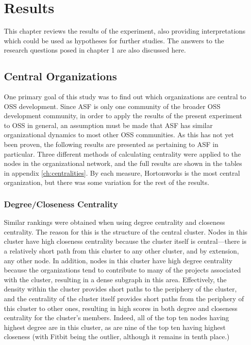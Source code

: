 \chapter{Results}
This chapter reviews the results of the experiment, also providing interpretations which could be used as hypotheses for further studies. The answers to the research questions posed in chapter 1 are also discussed here.

 

\section{Central Organizations}
One primary goal of this study was to find out which organizations are central to OSS development. Since ASF is only one community of the broader OSS development community, in order to apply the results of the present experiment to OSS in general, an assumption must be made that ASF has similar organizational dynamics to most other OSS communities. As this has not yet been proven, the following results are presented as pertaining to ASF in particular. Three different methods of calculating centrality were applied to the nodes in the organizational network, and the full results are shown in the tables in appendix \ref{ch:centralities}. By each measure, Hortonworks is the most central organization, but there was some variation for the rest of the results.

 
\subsection{Degree/Closeness Centrality}
Similar rankings were obtained when using degree centrality and closeness centrality. The reason for this is the structure of the central cluster. Nodes in this cluster have high closeness centrality because the cluster itself is central---there is a relatively short path from this cluster to any other cluster, and by extension, any other node. In addition, nodes in this cluster have high degree centrality because the organizations tend to contribute to many of the projects associated with the cluster, resulting in a dense subgraph in this area. Effectively, the density within the cluster provides short paths to the periphery of the cluster, and the centrality of the cluster itself provides short paths from the periphery of this cluster to other ones, resulting in high scores in both degree and closeness centrality for the cluster's members. Indeed, all of the top ten nodes having highest degree are in this cluster, as are nine of the top ten having highest closeness (with Fitbit being the outlier, although it remains in tenth place.)

